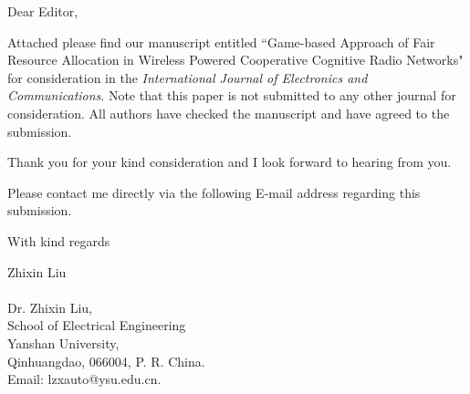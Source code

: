 \documentclass[12pt]{letter}
\begin{document}
Dear Editor,

Attached please find our manuscript entitled ``Game-based Approach of Fair Resource Allocation in Wireless Powered Cooperative Cognitive Radio Networks" for
consideration in the \emph{International Journal of Electronics and Communications}. Note that this paper
is not submitted to any other journal for consideration. All
authors have checked the manuscript and have agreed to the
submission.

Thank you for your kind consideration and I look forward to hearing
from you.

Please contact me directly via the following E-mail address
regarding this submission.

With kind regards

Zhixin Liu\\
\\

Dr. Zhixin Liu,\\
School of Electrical Engineering\\
Yanshan University,\\
Qinhuangdao, 066004, P. R. China.\\
Email: lzxauto@ysu.edu.cn.
\end{document}
